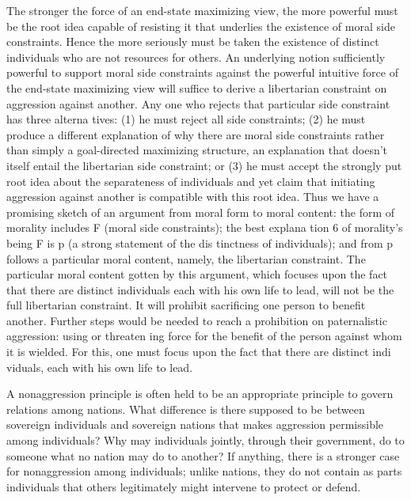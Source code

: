 \documentclass[11pt,openany]{book}
\begin{document}
The stronger the force of an end-state maximizing view, the more powerful must be the root idea capable of resisting it that underlies the existence of moral side constraints. Hence the more seriously must be taken the existence of distinct individuals who are not resources for others. An underlying notion sufficiently powerful to support moral side constraints against the powerful intuitive force of the end-state maximizing view will suffice to derive a libertarian constraint on aggression against another. Any one who rejects that particular side constraint has three alterna tives: (1) he must reject all side constraints; (2) he must produce a different explanation of why there are moral side constraints rather than simply a goal-directed maximizing structure, an explanation that doesn't itself entail the libertarian side constraint; or (3) he must accept the strongly put root idea about the separateness of individuals and yet claim that initiating aggression against another is compatible with this root idea. Thus we have a promising sketch of an argument from moral form to moral content: the form of morality includes F (moral side constraints); the best explana tion 6 of morality's being F is p (a strong statement of the dis tinctness of individuals); and from p follows a particular moral content, namely, the libertarian constraint. The particular moral content gotten by this argument, which focuses upon the fact that there are distinct individuals each with his own life to lead, will not be the full libertarian constraint. It will prohibit sacrificing one person to benefit another. Further steps would be needed to reach a prohibition on paternalistic aggression: using or threaten ing force for the benefit of the person against whom it is wielded. For this, one must focus upon the fact that there are distinct indi viduals, each with his own life to lead. 

A nonaggression principle is often held to be an appropriate principle to govern relations among nations. What difference is there supposed to be between sovereign individuals and sovereign nations that makes aggression permissible among individuals? Why may individuals jointly, through their government, do to someone what no nation may do to another? If anything, there is a stronger case for nonaggression among individuals; unlike nations, they do not contain as parts individuals that others legitimately might intervene to protect or defend. 
\end{document}
